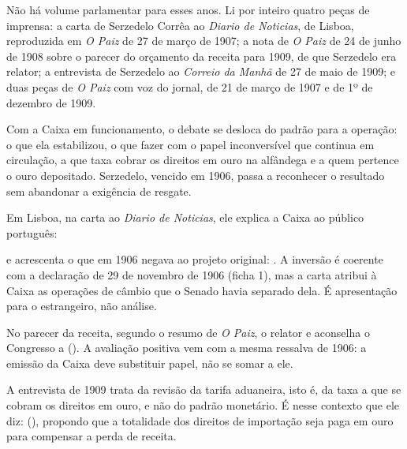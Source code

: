 

Não há volume parlamentar para esses anos. Li por inteiro quatro peças de
imprensa: a carta de Serzedelo Corrêa ao \textit{Diario de Noticias}, de
Lisboa, reproduzida em \textit{O Paiz} de 27 de março de 1907; a nota de
\textit{O Paiz} de 24 de junho de 1908 sobre o parecer do orçamento da receita
para 1909, de que Serzedelo era relator; a entrevista de Serzedelo ao
\textit{Correio da Manhã} de 27 de maio de 1909; e duas peças de \textit{O
Paiz} com voz do jornal, de 21 de março de 1907 e de 1º de dezembro de 1909.


Com a Caixa em funcionamento, o debate se desloca do padrão para a operação:
o que ela estabilizou, o que fazer com o papel inconversível que continua em
circulação, a que taxa cobrar os direitos em ouro na alfândega e a quem
pertence o ouro depositado. Serzedelo, vencido em 1906, passa a reconhecer o
resultado sem abandonar a exigência de resgate.


Em Lisboa, na carta ao \textit{Diario de Noticias}, ele explica a Caixa ao
público português:


e acrescenta o que em 1906 negava ao projeto original:
. A inversão é coerente com a declaração de 29 de novembro
de 1906 (ficha 1), mas a carta atribui à Caixa as operações de câmbio que o
Senado havia separado dela. É apresentação para o estrangeiro, não análise.

No parecer da receita, segundo o resumo de \textit{O Paiz}, o relator
 e aconselha o Congresso a  (). A avaliação positiva vem com a mesma ressalva de 1906:
a emissão da Caixa deve substituir papel, não se somar a ele.

A entrevista de 1909 trata da revisão da tarifa aduaneira, isto é, da taxa a
que se cobram os direitos em ouro, e não do padrão monetário. É nesse contexto
que ele diz:  (), propondo que a totalidade dos direitos de importação seja paga em
ouro para compensar a perda de receita.

